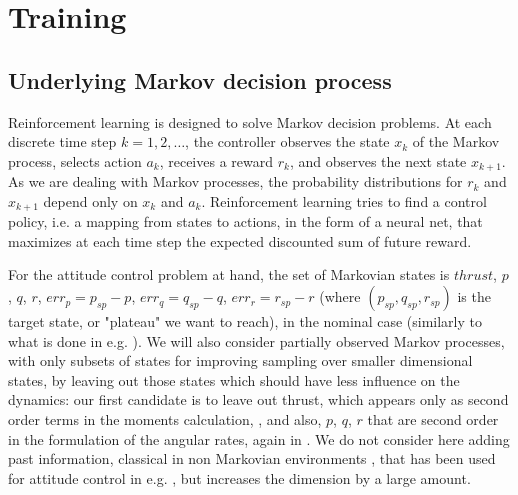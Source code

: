 \documentclass[anonymous=true,format=sigconf, screen=true, review=false]{acmart}
\begin{document}
\section{Training}

\label{sec:training}

\subsection{Underlying Markov decision process}

\label{sec:Markov}

Reinforcement learning is designed to solve Markov decision problems. At each discrete time step $k=1, 2, \ldots$, the controller observes the state $x_k$ of the Markov process, selects action $a_k$, receives a reward $r_k$, and observes
the next state $x_{k+1}$. As we are dealing with Markov processes, the probability distributions for $r_k$ and $x_{k+1}$ depend only on $x_k$ and $a_k$. Reinforcement learning tries to find a control policy, i.e. a mapping from states to actions, in the form of a neural net, that maximizes at each time step the expected discounted sum of future reward. 

For the attitude control problem at hand, the set of Markovian states is $thrust$, $p$, $q$, $r$, $err_p=p_{sp}-p$, $err_q=q_{sp}-q$, $err_r=r_{sp}-r$ (where $(p_{sp}, q_{sp}, r_{sp})$ is the target state, or "plateau" we want to reach), in the nominal case (similarly to what is done in e.g. \cite{Koning}). We will also consider partially observed Markov processes, with only subsets of states for improving sampling over smaller dimensional states, by leaving out those states which should have less influence on the dynamics: our first candidate is to leave out thrust, which appears only as second order terms in the moments calculation, , and also, $p$, $q$, $r$ that are second order in the formulation of the angular rates, again in . %
We do not consider here adding past information, classical in non Markovian environments \cite{NMR}, that has been used for attitude control in e.g. \cite{rl}, but increases the dimension by a large amount. 
\end{document}
